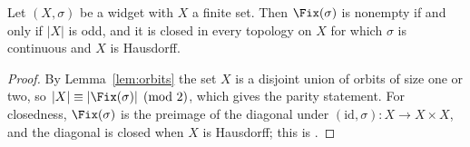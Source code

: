 
\begin{theorem}[Main]\label{dm-0003}
Let $(X,\sigma)$ be a widget with $X$ a finite set. Then $\Fix(\sigma)$ is nonempty if and only if $|X|$ is odd, and it is closed in every topology on $X$ for which $\sigma$ is continuous and $X$ is Hausdorff.
\end{theorem}
\begin{proof}
By Lemma~\ref{lem:orbits} the set $X$ is a disjoint union of orbits of size one or two, so $|X| \equiv |\Fix(\sigma)| \pmod 2$, which gives the parity statement. For closedness, $\Fix(\sigma)$ is the preimage of the diagonal under $(\mathrm{id},\sigma)\colon X\to X\times X$, and the diagonal is closed when $X$ is Hausdorff; this is \cite[Proposition 3.2]{Calloway14}.
\end{proof}
